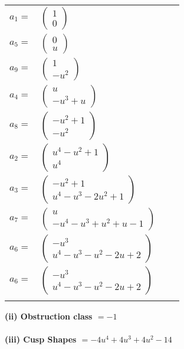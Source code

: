 \documentclass[1p]{elsarticle_modified}
\theoremstyle{definition}
\begin{document}
\begin{tabular}{m{7pt} m{180pt} m{7pt} m{180pt} }
\flushright $a_{1}=$&$\begin{pmatrix}1\\0\end{pmatrix}$ \\
\flushright $a_{5}=$&$\begin{pmatrix}0\\u\end{pmatrix}$ \\
\flushright $a_{9}=$&$\begin{pmatrix}1\\- u^2\end{pmatrix}$ \\
\flushright $a_{4}=$&$\begin{pmatrix}u\\- u^3+u\end{pmatrix}$ \\
\flushright $a_{8}=$&$\begin{pmatrix}- u^2+1\\- u^2\end{pmatrix}$ \\
\flushright $a_{2}=$&$\begin{pmatrix}u^4- u^2+1\\u^4\end{pmatrix}$ \\
\flushright $a_{3}=$&$\begin{pmatrix}- u^2+1\\u^4- u^3-2 u^2+1\end{pmatrix}$ \\
\flushright $a_{7}=$&$\begin{pmatrix}u\\- u^4- u^3+u^2+u-1\end{pmatrix}$ \\
\flushright $a_{6}=$&$\begin{pmatrix}- u^3\\u^4- u^3- u^2-2 u+2\end{pmatrix}$\\ \flushright $a_{6}=$&$\begin{pmatrix}- u^3\\u^4- u^3- u^2-2 u+2\end{pmatrix}$\\&\end{tabular}
\flushleft \textbf{(ii) Obstruction class $= -1$}\\~\\
\flushleft \textbf{(iii) Cusp Shapes $= -4 u^4+4 u^3+4 u^2-14$}\\~\\
\end{document}
